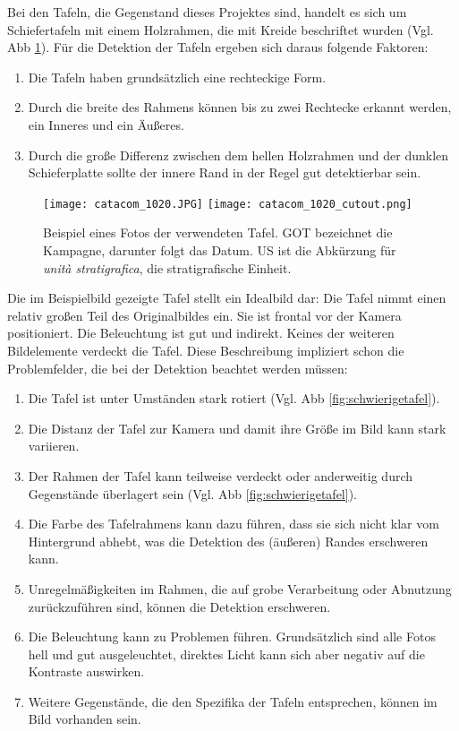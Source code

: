 Bei den Tafeln, die Gegenstand dieses Projektes sind, handelt es sich um Schiefertafeln mit einem Holzrahmen, die mit Kreide beschriftet wurden (Vgl. Abb \ref{fig:einfachetafel}). Für die Detektion der Tafeln ergeben sich daraus folgende Faktoren:\\
\begin{enumerate}
\item Die Tafeln haben grundsätzlich eine rechteckige Form.
\item Durch die breite des Rahmens können bis zu zwei Rechtecke erkannt werden, ein Inneres und ein Äußeres.
\item Durch die große Differenz zwischen dem hellen Holzrahmen und der dunklen Schieferplatte sollte der innere Rand in der Regel gut detektierbar sein.
\end{enumerate}
\begin{figure}[!h]
\texttt{[image: catacom\_1020.JPG]}
\texttt{[image: catacom\_1020\_cutout.png]}
\caption{Beispiel eines Fotos der verwendeten Tafel. GOT bezeichnet die Kampagne, darunter folgt das Datum. US ist die Abkürzung für \textit{unità stratigrafica}, die stratigrafische Einheit.}
\label{fig:einfachetafel}
\end{figure}
Die im Beispielbild gezeigte Tafel stellt  ein Idealbild dar: Die Tafel nimmt einen relativ großen Teil des Originalbildes ein. Sie ist frontal vor der Kamera positioniert. Die Beleuchtung ist gut und indirekt. Keines der weiteren Bildelemente verdeckt die Tafel.
Diese Beschreibung impliziert schon die Problemfelder, die bei der Detektion beachtet werden müssen:
\begin{enumerate}
\item Die Tafel ist unter Umständen stark rotiert (Vgl. Abb \ref{fig:schwierigetafel}).
\item Die Distanz der Tafel zur Kamera und damit ihre Größe im Bild kann stark variieren.
\item Der Rahmen der Tafel kann teilweise verdeckt oder anderweitig durch Gegenstände überlagert sein (Vgl. Abb \ref{fig:schwierigetafel}).
\item Die Farbe des Tafelrahmens kann dazu führen, dass sie sich nicht klar vom Hintergrund abhebt, was die Detektion des (äußeren) Randes erschweren kann.
\item Unregelmäßigkeiten im Rahmen, die auf grobe Verarbeitung oder Abnutzung zurückzuführen sind, können die Detektion erschweren.
\item Die Beleuchtung kann zu Problemen führen. Grundsätzlich sind alle Fotos hell und gut ausgeleuchtet, direktes Licht kann sich aber negativ auf die Kontraste auswirken.
\item Weitere Gegenstände, die den Spezifika der Tafeln entsprechen, können im Bild vorhanden sein.
\end{enumerate}
